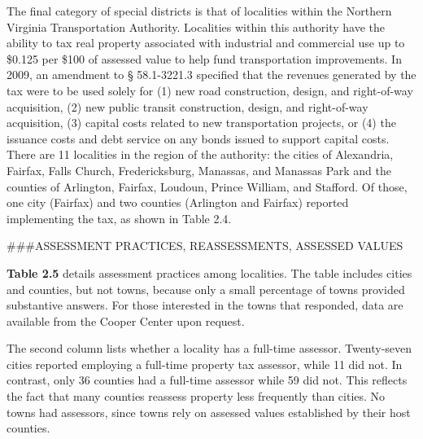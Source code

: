 \documentclass[
]{book}
\begin{document}
The final category of special districts is that of localities within the Northern Virginia Transportation Authority. Localities within this authority have the ability to tax real property associated with industrial and commercial use up
to \$0.125 per \$100 of assessed value to help fund transportation improvements. In 2009, an amendment to § 58.1-3221.3 specified that the revenues generated by the tax were to be used solely for (1) new road construction, design, and right-of-way acquisition, (2) new public transit construction, design, and right-of-way acquisition, (3) capital costs related to new transportation projects, or (4) the issuance costs and debt service on any bonds issued to support capital costs. There are 11 localities in the region of the authority: the cities of Alexandria, Fairfax, Falls Church, Fredericksburg, Manassas, and Manassas Park and the counties of Arlington, Fairfax, Loudoun, Prince William, and Stafford. Of those, one city (Fairfax) and two counties (Arlington and Fairfax) reported implementing the tax, as shown in Table 2.4.

\#\#\#ASSESSMENT PRACTICES, REASSESSMENTS, ASSESSED VALUES

\textbf{Table 2.5} details assessment practices among localities. The table includes cities and counties, but not towns, because only a small percentage of towns provided substantive answers. For those interested in the towns that responded, data are available from the Cooper Center upon request.

The second column lists whether a locality has a full-time assessor. Twenty-seven cities reported employing a full-time property tax assessor, while 11 did not. In contrast, only 36 counties had a full-time assessor while 59 did not. This reflects the fact that many counties reassess property less frequently than cities. No towns had assessors, since towns rely on assessed values established by their host counties.
\end{document}
